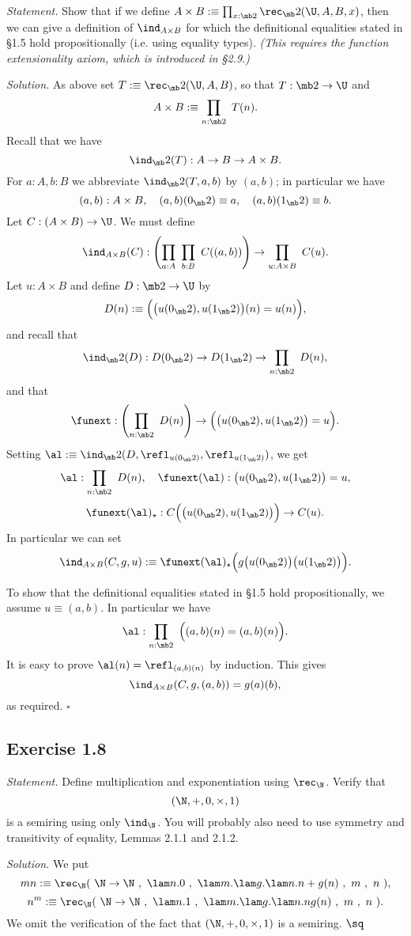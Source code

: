 \documentclass[12pt]{article}
\begin{document}
\emph{Statement.} Show that if we define $A\times B:\equiv\prod_{x:\mb2}\rec_\mb2(\U,A,B,x)$, then we can give a definition of  $\ind_{A\times B}$ for which the definitional equalities stated in \S1.5 hold propositionally (i.e. using equality types). \emph{(This requires the function extensionality axiom, which is introduced in \S2.9.)}

\nn\emph{Solution.} As above set $T:\equiv\rec_\mb2(\U,A,B)$, so that $T:\mb2\to\U$ and 
$$
A\times B:\equiv\prod_{n:\mb2}\ T(n).
$$ 
Recall that we have
$$
\ind_\mb2(T):A\to B\to A\times B.
$$ 
For $a:A,b:B$ we abbreviate $\ind_\mb2(T,a,b)$ by $(a,b)$; in particular we have 
$$
(a,b):A\times B,\quad(a,b)(0_\mb2)\equiv a,\quad(a,b)(1_\mb2)\equiv b.
$$ 
Let $C:(A\times B)\to\U$. We must define 
$$
\ind_{A\times B}(C):\left(\prod_{a:A}\ \prod_{b:B}\ C((a,b))\right)\to\prod_{u:A\times B}\ C(u).
$$ 
Let $u:A\times B$ and define $D:\mb2\to\U$ by 
$$
D(n):\equiv\Big(\big(u(0_\mb2),u(1_\mb2)\big)(n)=u(n)\Big),
$$ 
and recall that 
$$
\ind_\mb2(D):D(0_\mb2)\to D(1_\mb2)\to\prod_{n:\mb2}\ D(n),
$$ 
and that 
$$
\funext:\left(\prod_{n:\mb2}\ D(n)\right)\to\Big(\big(u(0_\mb2),u(1_\mb2)\big)=u\Big).
$$ 
Setting $\al:\equiv\ind_\mb2(D,\refl_{u(0_\mb2)},\refl_{u(1_\mb2)})$, we get 
$$
\al:\prod_{n:\mb2}\ D(n),\quad\funext(\al):\big(u(0_\mb2),u(1_\mb2)\big)=u,
$$
$$
\funext(\al)_\star:C\Big(\big(u(0_\mb2),u(1_\mb2)\big)\Big)\to C(u).
$$
In particular we can set
$$
\ind_{A\times B}(C,g,u):\equiv\funext(\al)_\star\Big(g\big(u(0_\mb2)\big)\big(u(1_\mb2)\big)\Big).
$$

To show that the definitional equalities stated in \S1.5 hold propositionally, we assume $u\equiv(a,b)$. In particular we have 
$$
\al:\prod_{n:\mb2}\ \Big((a,b)(n)=(a,b)(n)\Big).
$$ 
It is easy to prove $\al(n)=\refl_{(a,b)(n)}$ by induction. This gives 
$$
\ind_{A\times B}(C,g,(a,b))=g(a)(b),
$$ 
as required. $\square$


\subsection{Exercise 1.8}

\emph{Statement.} Define multiplication and exponentiation using $\rec_\N$. Verify that $$(\N,+,0,\times,1)$$ is a semiring using only $\ind_\N$. You will probably also need to use symmetry and transitivity of equality, Lemmas 2.1.1 and 2.1.2.

\nn\emph{Solution.} We put 
$$
mn:\equiv\rec_\N(\ \N\to\N\ ,\ \lam n.0\ ,\ \lam m.\lam g.\lam n.n+g(n)\ ,\ m\ ,\ n\ ),
$$
$$
n^m:\equiv\rec_\N(\ \N\to\N\ ,\ \lam n.1\ ,\ \lam m.\lam g.\lam n.ng(n)\ ,\ m\ ,\ n\ ).
$$ 
We omit the verification of the fact that $(\N,+,0,\times,1)$ is a semiring. $\sq$
\end{document}
